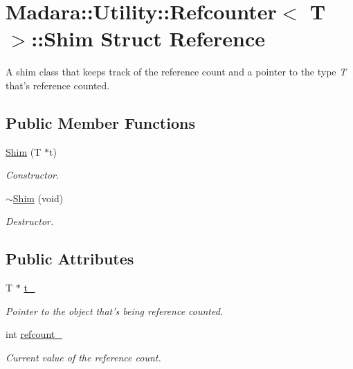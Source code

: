\hypertarget{structMadara_1_1Utility_1_1Refcounter_1_1Shim}{
\section{Madara::Utility::Refcounter$<$ T $>$::Shim Struct Reference}
\label{d9/d46/structMadara_1_1Utility_1_1Refcounter_1_1Shim}
}


A shim class that keeps track of the reference count and a pointer to the type {\itshape T\/} that's reference counted.  


\subsection*{Public Member Functions}
\begin{DoxyCompactItemize}
\item 
\hyperlink{structMadara_1_1Utility_1_1Refcounter_1_1Shim_ab384ee34ef8134811144d79d36cbbd0c}{Shim} (T $\ast$t)
\begin{DoxyCompactList}\small\item\em Constructor. \item\end{DoxyCompactList}\item 
\hyperlink{structMadara_1_1Utility_1_1Refcounter_1_1Shim_a04577a9ad45ade28bbacfd6ea584bfc7}{$\sim$Shim} (void)
\begin{DoxyCompactList}\small\item\em Destructor. \item\end{DoxyCompactList}\end{DoxyCompactItemize}
\subsection*{Public Attributes}
\begin{DoxyCompactItemize}
\item 
T $\ast$ \hyperlink{structMadara_1_1Utility_1_1Refcounter_1_1Shim_a5d947b2e53f84757eb6f307ceeb72312}{t\_\-}
\begin{DoxyCompactList}\small\item\em Pointer to the object that's being reference counted. \item\end{DoxyCompactList}\item 
int \hyperlink{structMadara_1_1Utility_1_1Refcounter_1_1Shim_a189dbf593317e1844f01375a6b0e702d}{refcount\_\-}
\begin{DoxyCompactList}\small\item\em Current value of the reference count. \item\end{DoxyCompactList}\end{DoxyCompactItemize}


